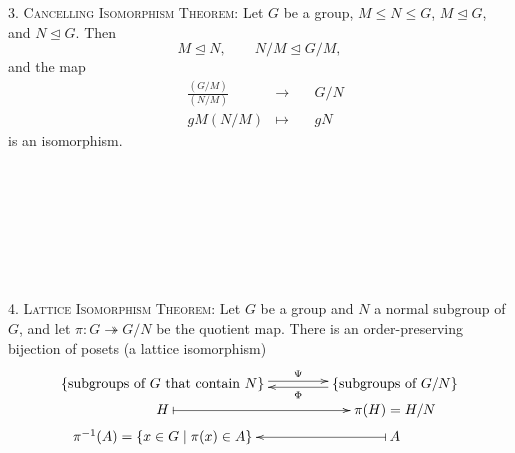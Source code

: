 \documentclass[12pt]{amsart}
\begin{document}
\newpage

\begin{framed}
\textsc{3. Cancelling Isomorphism Theorem:} Let $G$ be a group, $M \leq N \leq G$, $M \trianglelefteq G$, and $N \trianglelefteq G$. Then 
$$M \trianglelefteq N, \qquad N/M \trianglelefteq G/M,$$ 
and the map
\[\begin{aligned} & \frac{(G/M)}{(N/M)}  &\longrightarrow & \quad G/N\\ 
& gM(N/M) &\mapsto &\quad gN \end{aligned}\] 
is an isomorphism.

\ 

 \
 
\noindent \hrulefill
 
 \
 
 \

\textsc{4. Lattice Isomorphism Theorem:} Let $G$ be a group and $N$ a normal subgroup of $G$, and let $\pi\!: G \twoheadrightarrow G/N$ be the quotient map. There is an order-preserving bijection of posets (a lattice isomorphism)
$$\xymatrix@R=1mm@C=15mm{
\{\text{subgroups of $G$ that contain $N$}\} \ar@<0.5ex>[r]^-{\Psi} & \ar@<0.5ex>[l]^-{\Phi} \{\text{subgroups of $G/N$}\} \\
H \ar@{|->}[r] & \pi(H)= H/N \\
\pi^{-1}(A) = \{x \in G \mid \pi(x) \in A \} & A \ar@{|->}[l]
}$$


\end{framed}
\end{document}

